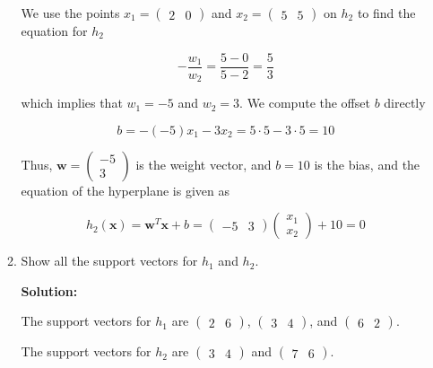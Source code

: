 \documentclass[11pt]{article}
\begin{document}
\begin{enumerate}
\begin{enumerate}
We use the points $x_1 = (\begin{array}{cc}2 & 0 \end{array})$ and $x_2 = (\begin{array}{cc}5 & 5 \end{array})$ on $h_2$ to find the equation for $h_2$

\begin{equation*}
-\frac{w_1}{w_2} = \frac{5-0}{5-2} = \frac{5}{3}
\end{equation*}

which implies that $w_1 = -5$ and $w_2 = 3$. We compute the offset $b$ directly

\begin{equation*}
b = - (-5) x_1 - 3 x_2 = 5 \cdot 5 - 3 \cdot 5 = 10
\end{equation*}

Thus, $\mathbf{w} = \left( \begin{array}{c} -5 \\ 3 \end{array} \right)$ is the weight vector, and $b = 10$ is the bias, and the equation of the hyperplane is given as

\begin{equation*}
h_2(\mathbf{x}) = \mathbf{w}^\mathit{T} \mathbf{x} + b = (\begin{array}{cc} -5 & 3 \end{array}) \left( \begin{array}{c} x_1 \\ x_2 \end{array} \right) + 10 = 0
\end{equation*}

\item Show all the support vectors for $h_1$ and $h_2$.

\textbf{Solution:}

The support vectors for $h_1$ are $(\begin{array}{cc} 2 & 6 \end{array})$, $(\begin{array}{cc} 3 & 4 \end{array})$, and $(\begin{array}{cc} 6 & 2 \end{array})$.

The support vectors for $h_2$ are $(\begin{array}{cc} 3 & 4 \end{array})$ and $(\begin{array}{cc} 7 & 6 \end{array})$.


\end{enumerate}
\end{enumerate}
\end{document}
